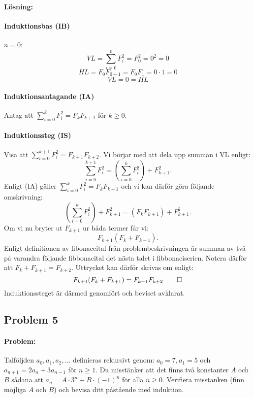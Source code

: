 \documentclass[12pt]{article}
\begin{document}
\paragraph{Lösning:}
\paragraph{Induktionsbas (IB)} $n=0$:
\[VL = \sum_{i=0}^0F_i^2 = F_0^2 = 0^2 = 0\]
\[HL = F_{0}F_{0+1} = F_0F_1 = 0\cdot1 = 0\]
\[VL = 0 = HL\]

\paragraph{Induktionsantagande (IA)} Antag att \(\sum_{i=0}^kF_i^2=F_kF_{k+1}\) för $k \ge0$.

\paragraph{Induktionssteg (IS)} Visa att \(\sum_{i=0}^{k+1}F_i^2=F_{k+1}F_{k+2}\).\newline
Vi börjar med att dela upp summan i VL enligt:
\[\sum_{i=0}^{k+1}F_i^2 = (\sum_{i=0}^{k}F_i^2) + F_{k+1}^2.\]
Enligt (IA) gäller \(\sum_{i=0}^{k}F_i^2 = F_kF_{k+1}\) och vi kan därför göra följande omskrivning:
\[(\sum_{i=0}^{k}F_i^2) + F_{k+1}^2 = (F_kF_{k+1})+F_{k+1}^2.\]
Om vi nu bryter ut $F_{k+1}$ ur båda termer får vi:
\[F_{k+1}(F_k+F_{k+1}).\]
Enligt definitionen av fibonaccital från problembeskrivningen är summan av två på varandra följande fibbonacital det nästa talet i fibbonaciserien. Notera därför att $F_k+F_{k+1} = F_{k+2}$. Uttrycket kan därför skrivas om enligt:
\[F_{k+1}(F_k+F_{k+1}) = F_{k+1}F_{k+2} \qed\]
Induktionssteget är därmed genomfört och beviset avklarat.

\newpage \noindent
\subsection*{Problem 5}
\paragraph{Problem:} Talföljden $a_0, a_1, a_2,\dotsc$ definieras rekursivt genom: \newline \(a_0=7, a_1 =5\) och \(a_{n+1} = 2a_n + 3a_{n-1}\) för $n\ge 1$. Du misstänker att det finns två konstanter $A$ och $B$ sådana att $a_n =A\cdot 3^n + B\cdot (-1)^n$ för alla $n\ge 0$. Verifiera misstanken (finn möjliga $A$ och $B$) och bevisa ditt påstående med induktion.
\end{document}
